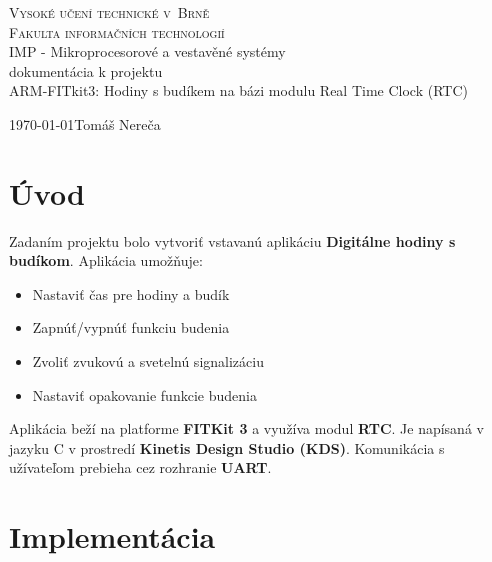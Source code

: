 \documentclass{article}
\begin{document}
    \begin{titlepage}
        \begin{center}
            \textsc{\Huge Vysoké učení technické v~Brně\\
            		\huge Fakulta informačních technologií\\}
            {\LARGE IMP - Mikroprocesorové a vestavěné systémy\\}\vspace{2em}
            {\Large dokumentácia k projektu\\}\vspace{2em}
            \huge ARM-FITkit3: Hodiny s budíkem na bázi modulu Real Time Clock (RTC)\\
        \end{center}
        {\Large \today \hfill Tomáš Nereča}\vspace{-2em}
    \end{titlepage}

    \tableofcontents
        \thispagestyle{empty}
        \newpage
        \setcounter{page}{1}
    \newpage
    
    \section{Úvod}
        Zadaním projektu bolo vytvoriť vstavanú aplikáciu \textbf{Digitálne hodiny s budíkom}.
        Aplikácia umožňuje:\\
        \begin{itemize}
            \item Nastaviť čas pre hodiny a budík
            \item Zapnúť/vypnúť funkciu budenia
            \item Zvoliť zvukovú a svetelnú signalizáciu
            \item Nastaviť opakovanie funkcie budenia
        \end{itemize}
        Aplikácia beží na platforme \textbf{FITKit 3} a využíva modul \textbf{RTC}.
        Je napísaná v jazyku C v prostredí \textbf{Kinetis Design Studio (KDS)}.
        Komunikácia s užívateľom prebieha cez rozhranie \textbf{UART}.
    
    \section{Implementácia}
\end{document}
